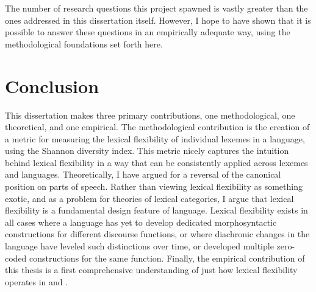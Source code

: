 The number of research questions this project spawned is vastly greater than the ones addressed in this dissertation itself. However, I hope to have shown that it is possible to answer these questions in an empirically adequate way, using the methodological foundations set forth here.

\section{Conclusion}
\label{sec:5.5}

This dissertation makes three primary contributions, one methodological, one theoretical, and one empirical. The methodological contribution is the creation of a metric for measuring the lexical flexibility of individual lexemes in a language, using the Shannon diversity index. This metric nicely captures the intuition behind lexical flexibility in a way that can be consistently applied across lexemes and languages. Theoretically, I have argued for a reversal of the canonical position on parts of speech. Rather than viewing lexical flexibility as something exotic, and as a problem for theories of lexical categories, I argue that lexical flexibility is a fundamental design feature of language. Lexical flexibility exists in all cases where a language has yet to develop dedicated morphosyntactic constructions for different discourse functions, or where diachronic changes in the language have leveled such distinctions over time, or developed multiple zero-coded constructions for the same function. Finally, the empirical contribution of this thesis is a first comprehensive understanding of just how lexical flexibility operates in  and .
